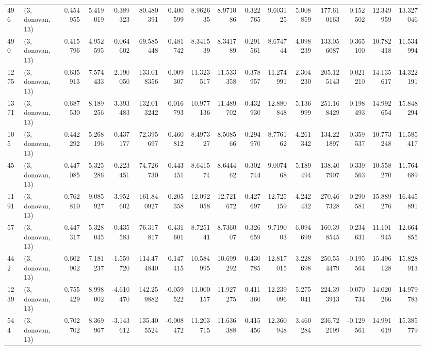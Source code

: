 \begin{tabular}{llrrrrrrrrrrrrrr}
496  &  (3, donovan, 13) &   0.454955 &   5.419019 &  -0.389323 &     80.480391 &    0.400599 &    8.962635 &    8.971086 &  0.322765 &   9.603125 &   5.008859 &   177.610163 &   0.152502 &  12.349959 &  13.327046 \\
490  &  (3, donovan, 13) &   0.415796 &   4.952595 &  -0.064602 &     69.585448 &    0.481742 &    8.341539 &    8.341789 &  0.291561 &   8.674744 &   4.098239 &   133.056087 &   0.365100 &  10.782418 &  11.534994 \\
1275 &  (3, donovan, 13) &   0.635913 &   7.574433 &  -2.190050 &    133.018356 &    0.009307 &   11.323517 &   11.533358 &  0.378957 &  11.274991 &   2.304230 &   205.125143 &   0.021210 &  14.135617 &  14.322191 \\
1371 &  (3, donovan, 13) &   0.687530 &   8.189256 &  -3.393483 &    132.013242 &    0.016793 &   10.977136 &   11.489702 &  0.432930 &  12.880848 &   5.136999 &   251.168429 &  -0.198493 &  14.992654 &  15.848294 \\
105  &  (3, donovan, 13) &   0.442292 &   5.268196 &  -0.437177 &     72.395697 &    0.460812 &    8.497327 &    8.508566 &  0.294970 &   8.776162 &   4.261342 &   134.221897 &   0.359537 &  10.773248 &  11.585417 \\
45   &  (3, donovan, 13) &   0.447085 &   5.325286 &  -0.223451 &     74.726730 &    0.443451 &    8.641574 &    8.644462 &  0.302744 &   9.007468 &   5.189494 &   138.407907 &   0.339563 &  10.558270 &  11.764689 \\
1191 &  (3, donovan, 13) &   0.762810 &   9.085927 &  -3.952602 &    161.840927 &   -0.205358 &   12.092058 &   12.721672 &  0.427697 &  12.725159 &   4.242432 &   270.467328 &  -0.290581 &  15.889276 &  16.445891 \\
57   &  (3, donovan, 13) &   0.447317 &   5.328045 &  -0.435583 &     76.317817 &    0.431601 &    8.725141 &    8.736007 &  0.326659 &   9.719003 &   6.094699 &   160.398545 &   0.234631 &  11.101945 &  12.664855 \\
442  &  (3, donovan, 13) &   0.602902 &   7.181237 &  -1.559720 &    114.474840 &    0.147415 &   10.584995 &   10.699292 &  0.430785 &  12.817015 &   3.228698 &   250.554479 &  -0.195564 &  15.496128 &  15.828913 \\
1239 &  (3, donovan, 13) &   0.755429 &   8.998002 &  -4.610470 &    142.259882 &   -0.059522 &   11.000157 &   11.927275 &  0.411360 &  12.239096 &   5.275041 &   224.393913 &  -0.070734 &  14.020266 &  14.979783 \\
544  &  (3, donovan, 13) &   0.702702 &   8.369967 &  -3.143612 &    135.405524 &   -0.008472 &   11.203715 &   11.636388 &  0.415456 &  12.360948 &   3.460284 &   236.722199 &  -0.129561 &  14.991619 &  15.385779 \\

\end{tabular}
